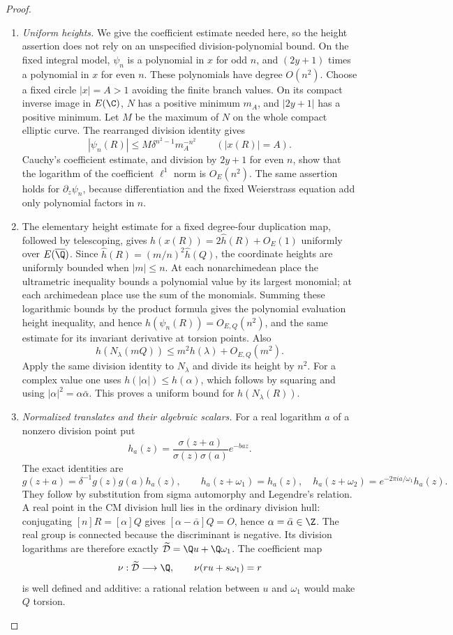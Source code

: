 \begin{proof}
\begin{enumerate}[label=\arabic*.,leftmargin=*]
\item \emph{Uniform heights.}
We give the coefficient estimate needed here, so the height
assertion does not rely on an unspecified division-polynomial
bound.  On the fixed integral model, $\psi_n$ is a polynomial
in $x$ for odd $n$, and $(2y+1)$ times a polynomial in $x$
for even $n$.  These polynomials have degree $O(n^2)$.
Choose a fixed circle $|x|=A>1$ avoiding the finite branch values.
On its compact inverse image in $E(\C)$, $N$ has a positive
minimum $m_A$, and $|2y+1|$ has a positive minimum.  Let $M$
be the maximum of $N$ on the whole compact elliptic curve.
The rearranged division identity gives
\[
 |\psi_n(R)|\leq M\delta^{n^2-1}m_A^{-n^2}
       \qquad(|x(R)|=A).
\]
Cauchy's coefficient estimate, and division by $2y+1$ for
even $n$, show that the logarithm of the coefficient
$\ell^1$ norm is $O_E(n^2)$.  The same assertion holds for
$\partial_z\psi_n$, because differentiation and the fixed
Weierstrass equation add only polynomial factors in $n$.

\item The elementary height estimate for a fixed degree-four
duplication map, followed by telescoping, gives
$h(x(R))=2\widehat h(R)+O_E(1)$ uniformly over
$E(\overline\Q)$.  Since
$\widehat h(R)=(m/n)^2\widehat h(Q)$, the coordinate heights
are uniformly bounded when $|m|\leq n$.
At each nonarchimedean place the ultrametric inequality bounds a
polynomial value by its largest monomial; at each archimedean
place use the sum of the monomials. Summing these logarithmic
bounds by the product formula gives the polynomial evaluation
height inequality, and hence
$h(\psi_n(R))=O_{E,Q}(n^2)$, and the same estimate for its
invariant derivative at torsion points.  Also
\[
 h(N_\lambda(mQ))\leq m^2h(\lambda)+O_{E,Q}(m^2).
\]
Apply the same division identity to $N_\lambda$ and divide its height by $n^2$.
For a complex value one uses
$h(|\alpha|)\leq h(\alpha)$, which follows by squaring and
using $|\alpha|^2=\alpha\bar\alpha$.
This proves a uniform bound for $h(N_\lambda(R))$.

\item \emph{Normalized translates and their algebraic scalars.}
For a real logarithm $a$ of a nonzero division point put
\[
 h_a(z)=\frac{\sigma(z+a)}{\sigma(z)\sigma(a)}e^{-baz}.
\]
The exact identities are
\[
 g(z+a)=\delta^{-1}g(z)g(a)h_a(z),\qquad
 h_a(z+\omega_1)=h_a(z),\quad
 h_a(z+\omega_2)=e^{-2\pi ia/\omega_1}h_a(z).
\]
They follow by substitution from sigma automorphy and Legendre's
relation. A real point in the CM division hull lies in the
ordinary division hull: conjugating $[n]R=[\alpha]Q$ gives
$[\alpha-\bar\alpha]Q=O$, hence $\alpha=\bar\alpha\in\Z$.
The real group is connected because the discriminant is negative.
Its division logarithms are therefore exactly
$\widetilde{\mathcal D}=\Q u+\Q\omega_1$.
The coefficient map
\[
 \nu:\widetilde{\mathcal D}\longrightarrow\Q,
 \qquad \nu(ru+s\omega_1)=r
\]
is well defined and additive: a rational relation between $u$
and $\omega_1$ would make $Q$ torsion.


\end{enumerate}
\end{proof}
